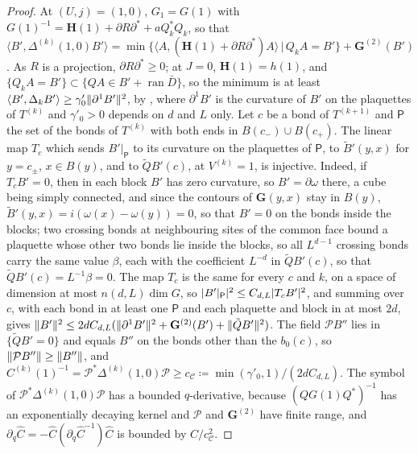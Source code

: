 \documentclass[11pt]{preprint}
\DeclarePairedDelimiter{\abs}{\lvert}{\rvert}
\DeclarePairedDelimiter{\norm}{\lVert}{\rVert}
\numberwithin{equation}{section}
\theoremstyle{definition}
\theoremstyle{remark}
\theoremstyle{plain}
\begin{document}
\begin{proof}
At $(U, j) = (1, 0)$, $G_1 = G(1)$ with $G(1)^{-1} = \mathbf H(1) + \partial R\partial^* + aQ_k^*Q_k$, so that $\langle B', \Delta^{(k)}(1, 0)B' \rangle = \min\{ \langle A, (\mathbf H(1) + \partial R\partial^*)A \rangle \, | \, Q_kA = B' \} + \mathbf G^{(2)}(B')$. As $R$ is a projection, $\partial R\partial^* \geq 0$; at $J = 0$, $\mathbf H(1) = h(1)$, and $\{ Q_kA = B' \} \subset \{ QA \in B' + \operatorname{ran}\bar D \}$, so the minimum is at least $\langle B', \Delta_kB' \rangle \geq \gamma'_0\norm{\partial^1B'}^2$, by \cite[(1.65), (1.67), p.~29]{BalabanPRT1}, where $\partial^1B'$ is the curvature of $B'$ on the plaquettes of $T^{(k)}$ and $\gamma'_0 > 0$ depends on $d$ and $L$ only. Let $c$ be a bond of $T^{(k+1)}$ and $\mathsf P$ the set of the bonds of $T^{(k)}$ with both ends in $B(c_-) \cup B(c_+)$. The linear map $T_c$ which sends $B'|_{\mathsf P}$ to its curvature on the plaquettes of $\mathsf P$, to $\tilde B'(y, x)$ for $y = c_\pm$, $x \in B(y)$, and to $\tilde QB'(c)$, at $V^{(k)} = 1$, is injective. Indeed, if $T_cB' = 0$, then in each block $B'$ has zero curvature, so $B' = \partial\omega$ there, a cube being simply connected, and since the contours of $\mathbf G(y, x)$ stay in $B(y)$, $\tilde B'(y, x) = i(\omega(x) - \omega(y)) = 0$, so that $B' = 0$ on the bonds inside the blocks; two crossing bonds at neighbouring sites of the common face bound a plaquette whose other two bonds lie inside the blocks, so all $L^{d-1}$ crossing bonds carry the same value $\beta$, each with the coefficient $L^{-d}$ in $\tilde QB'(c)$, so that $\tilde QB'(c) = L^{-1}\beta = 0$. The map $T_c$ is the same for every $c$ and $k$, on a space of dimension at most $n(d, L)\dim G$, so $\abs{B'|_{\mathsf P}}^2 \leq C_{d,L}\abs{T_cB'}^2$, and summing over $c$, with each bond in at least one $\mathsf P$ and each plaquette and block in at most $2d$, gives $\norm{B'}^2 \leq 2dC_{d,L}(\norm{\partial^1B'}^2 + \mathbf G^{(2)}(B') + \norm{\tilde QB'}^2)$. The field $\mathcal PB''$ lies in $\{ \tilde QB' = 0 \}$ and equals $B''$ on the bonds other than the $b_0(c)$, so $\norm{\mathcal PB''} \geq \norm{B''}$, and $C^{(k)}(1)^{-1} = \mathcal P^*\Delta^{(k)}(1, 0)\mathcal P \geq c_{\mathcal C} \coloneqq \min(\gamma'_0, 1)/(2dC_{d,L})$. The symbol of $\mathcal P^*\Delta^{(k)}(1, 0)\mathcal P$ has a bounded $q$-derivative, because $(QG(1)Q^*)^{-1}$ has an exponentially decaying kernel \cite[(3.132), p.~422]{BalabanPBG} and $\mathcal P$ and $\mathbf G^{(2)}$ have finite range, and $\partial_q\hat C = -\hat C(\partial_q\hat C^{-1})\hat C$ is bounded by $C/c_{\mathcal C}^2$.
\end{proof}
\end{document}
